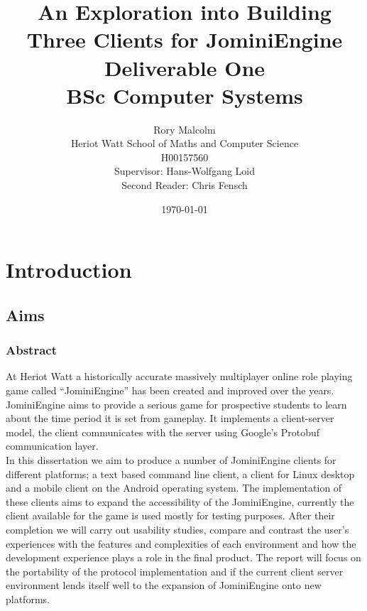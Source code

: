 \documentclass{article}
\title{An Exploration into Building Three Clients for JominiEngine\\ Deliverable One\\BSc Computer Systems}
\author{Rory Malcolm\\Heriot Watt School of Maths and Computer Science\\H00157560\\Supervisor: Hans-Wolfgang Loid\\Second Reader: Chris Fensch}
\date{\today}
\begin{document}
	\maketitle
	\newpage
	\tableofcontents
	\newpage
	\section{Introduction}
	\subsection{Aims}
	\subsubsection{Abstract}
	At Heriot Watt a historically accurate massively multiplayer online role playing game called “JominiEngine” has been created and improved over the years. JominiEngine aims to provide a serious game for prospective students to learn about the time period it is set from gameplay. It implements a client-server model, the client communicates with the server using Google's Protobuf communication layer.\\

	In this dissertation we aim to produce a number of JominiEngine clients for different platforms; a text based command line client, a client for Linux desktop and a mobile client on the Android operating system. The implementation of these clients aims to expand the accessibility of the JominiEngine, currently the client available for the game is used mostly for testing purposes. After their completion we will carry out usability studies, compare and contrast the user’s experiences with the features and complexities of each environment and how the development experience plays a role in the final product. The report will focus on the portability of the protocol implementation and if the current client server environment lends itself well to the expansion of JominiEngine onto new platforms.
\end{document}
